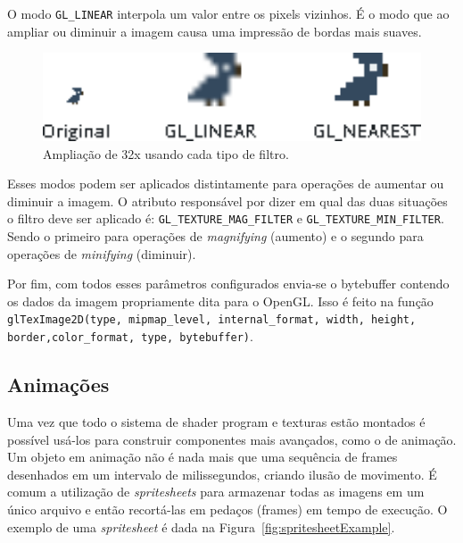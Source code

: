 \documentclass[12pt, 
openright, 
oneside, 
a4paper,    
brazil]{facom-ufu-abntex2}
\begin{document}
O modo \texttt{GL_LINEAR} interpola um valor entre os pixels vizinhos. É o modo que ao ampliar ou diminuir a imagem causa uma impressão de bordas mais suaves.

\begin{figure}[H]
	\centering
	\includegraphics[width=36em]{imagens/gl_filters.png}
	\caption{Ampliação de 32x usando cada tipo de filtro. \label{fig:ampli}}
\end{figure}

Esses modos podem ser aplicados distintamente para operações de aumentar ou diminuir a imagem. O atributo responsável por dizer em qual das duas situações o filtro deve ser aplicado é: \texttt{GL_TEXTURE_MAG_FILTER} e \texttt{GL_TEXTURE_MIN_FILTER}. Sendo o primeiro para operações de \textit{magnifying} (aumento) e o segundo para operações de \textit{minifying} (diminuir).

Por fim, com todos esses parâmetros configurados envia-se o bytebuffer contendo os dados da imagem propriamente dita para o OpenGL. Isso é feito na função \linebreak \texttt{glTexImage2D(type, mipmap_level, internal_format, width, height, border,\linebreak color_format, type, bytebuffer)}.

\subsection{Animações}
Uma vez que todo o sistema de shader program e texturas estão montados é possível usá-los para construir componentes mais avançados, como o de animação. Um objeto em animação não é nada mais que uma sequência de frames desenhados em um intervalo de milissegundos, criando ilusão de movimento. É comum a utilização de \textit{spritesheets} para armazenar todas as imagens em um único arquivo e então recortá-las em pedaços (frames) em tempo de execução. O exemplo de uma \textit{spritesheet} é dada na Figura~\ref{fig:spritesheetExample}.
\end{document}
